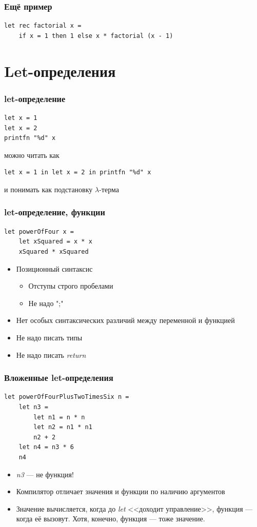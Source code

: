 \documentclass[xetex,mathserif,serif]{beamer}
\begin{document}
	\begin{frame}[fragile]
		\frametitle{Ещё пример}
		\begin{verbatim}
let rec factorial x =
    if x = 1 then 1 else x * factorial (x - 1)
		\end{verbatim}
\end{frame}
	
	\section{Let-определения}

	\begin{frame}[fragile]
		\frametitle{let-определение}
		\begin{verbatim}
let x = 1
let x = 2
printfn "%d" x
		\end{verbatim}
		можно читать как
		\begin{verbatim}
let x = 1 in let x = 2 in printfn "%d" x
		\end{verbatim}
		и понимать как подстановку $\lambda$-терма
\end{frame}
		
	\begin{frame}[fragile]
		\frametitle{let-определение, функции}
		\begin{verbatim}
let powerOfFour x = 
    let xSquared = x * x
    xSquared * xSquared
		\end{verbatim}
		\begin{itemize}
			\item Позиционный синтаксис
			\begin{itemize}
				\item Отступы строго пробелами
				\item Не надо ";"
			\end{itemize}
			\item Нет особых синтаксических различий между переменной и функцией
			\item Не надо писать типы
			\item Не надо писать \textit{return}
		\end{itemize}
\end{frame}

	\begin{frame}[fragile]
		\frametitle{Вложенные let-определения}
		\begin{verbatim}
let powerOfFourPlusTwoTimesSix n =
    let n3 =
        let n1 = n * n
        let n2 = n1 * n1
        n2 + 2
    let n4 = n3 * 6
    n4
		\end{verbatim}
		\begin{itemize}
			\item \textit{n3} --- не функция!
			\item Компилятор отличает значения и функции по наличию аргументов
			\item Значение вычисляется, когда до \textit{let} <<доходит управление>>, 
					функция --- когда её вызовут. Хотя, конечно, функция --- тоже значение.
		\end{itemize}
\end{frame}
\end{document}
